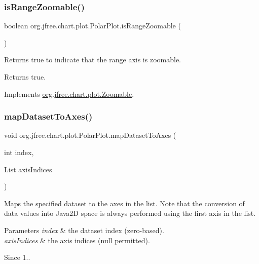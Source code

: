 \subsubsection{\texorpdfstring{is\+Range\+Zoomable()}{isRangeZoomable()}}
{\footnotesize\ttfamily boolean org.\+jfree.\+chart.\+plot.\+Polar\+Plot.\+is\+Range\+Zoomable (\begin{DoxyParamCaption}{ }\end{DoxyParamCaption})}

Returns {\ttfamily true} to indicate that the range axis is zoomable.

\begin{DoxyReturn}{Returns}
{\ttfamily true}. 
\end{DoxyReturn}


Implements \mbox{\hyperlink{interfaceorg_1_1jfree_1_1chart_1_1plot_1_1_zoomable_aee592b4d6f620a0571974e29247a66b1}{org.\+jfree.\+chart.\+plot.\+Zoomable}}.

\mbox{\label{classorg_1_1jfree_1_1chart_1_1plot_1_1_polar_plot_a68cd9159d58a112b65f1164be6b2c8cf}} 
\subsubsection{\texorpdfstring{map\+Dataset\+To\+Axes()}{mapDatasetToAxes()}}
{\footnotesize\ttfamily void org.\+jfree.\+chart.\+plot.\+Polar\+Plot.\+map\+Dataset\+To\+Axes (\begin{DoxyParamCaption}\item[{int}]{index,  }\item[{List}]{axis\+Indices }\end{DoxyParamCaption})}

Maps the specified dataset to the axes in the list. Note that the conversion of data values into Java2D space is always performed using the first axis in the list.


\begin{DoxyParams}{Parameters}
{\em index} & the dataset index (zero-\/based). \\
\hline
{\em axis\+Indices} & the axis indices ({\ttfamily null} permitted).\\
\hline
\end{DoxyParams}
\begin{DoxySince}{Since}
1.. 
\end{DoxySince}
\mbox{\label{classorg_1_1jfree_1_1chart_1_1plot_1_1_polar_plot_ac599a0a775d458e5351f3fdc12f5f963}} 
